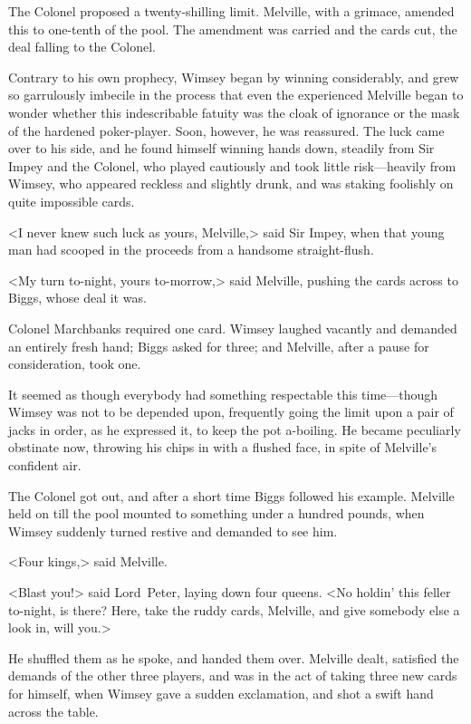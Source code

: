 The Colonel proposed a twenty-shilling limit. Melville, with a grimace, amended this to one-tenth of the pool. The amendment was carried and the cards cut, the deal falling to the Colonel.

Contrary to his own prophecy, Wimsey began by winning considerably, and grew so garrulously imbecile in the process that even the experienced Melville began to wonder whether this indescribable fatuity was the cloak of ignorance or the mask of the hardened poker-player. Soon, however, he was reassured. The luck came over to his side, and he found himself winning hands down, steadily from Sir Impey and the Colonel, who played cautiously and took little risk—heavily from Wimsey, who appeared reckless and slightly drunk, and was staking foolishly on quite impossible cards.

<I never knew such luck as yours, Melville,> said Sir Impey, when that young man had scooped in the proceeds from a handsome straight-flush.

<My turn to-night, yours to-morrow,> said Melville, pushing the cards across to Biggs, whose deal it was.

Colonel Marchbanks required one card. Wimsey laughed vacantly and demanded an entirely fresh hand; Biggs asked for three; and Melville, after a pause for consideration, took one.

It seemed as though everybody had something respectable this time—though Wimsey was not to be depended upon, frequently going the limit upon a pair of jacks in order, as he expressed it, to keep the pot a-boiling. He became peculiarly obstinate now, throwing his chips in with a flushed face, in spite of Melville's confident air.

The Colonel got out, and after a short time Biggs followed his example. Melville held on till the pool mounted to something under a hundred pounds, when Wimsey suddenly turned restive and demanded to see him.

<Four kings,> said Melville.

<Blast you!> said Lord~Peter, laying down four queens. <No holdin' this feller to-night, is there? Here, take the ruddy cards, Melville, and give somebody else a look in, will you.>

He shuffled them as he spoke, and handed them over. Melville dealt, satisfied the demands of the other three players, and was in the act of taking three new cards for himself, when Wimsey gave a sudden exclamation, and shot a swift hand across the table.

